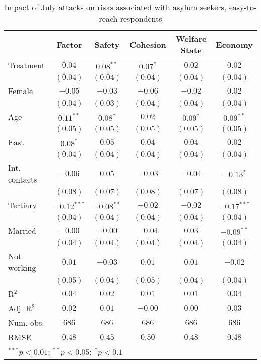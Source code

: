 
\begin{table}
\caption{Impact of July attacks on risks associated with asylum seekers, easy-to-reach respondents}
\begin{center}
\begin{tabular}{l c c c c c}
\toprule
 & Factor & Safety & Cohesion & Welfare State & Economy \\
\midrule
Treatment     & $0.04$        & $0.08^{**}$  & $0.07^{*}$ & $0.02$     & $0.02$        \\
              & $(0.04)$      & $(0.04)$     & $(0.04)$   & $(0.04)$   & $(0.04)$      \\
Female        & $-0.05$       & $-0.03$      & $-0.06$    & $-0.02$    & $0.02$        \\
              & $(0.04)$      & $(0.03)$     & $(0.04)$   & $(0.04)$   & $(0.04)$      \\
Age           & $0.11^{**}$   & $0.08^{*}$   & $0.02$     & $0.09^{*}$ & $0.09^{**}$   \\
              & $(0.05)$      & $(0.05)$     & $(0.05)$   & $(0.05)$   & $(0.05)$      \\
East          & $0.08^{*}$    & $0.05$       & $0.04$     & $0.04$     & $0.02$        \\
              & $(0.04)$      & $(0.04)$     & $(0.04)$   & $(0.04)$   & $(0.04)$      \\
Int. contacts & $-0.06$       & $0.05$       & $-0.03$    & $-0.04$    & $-0.13^{*}$   \\
              & $(0.08)$      & $(0.07)$     & $(0.08)$   & $(0.07)$   & $(0.08)$      \\
Tertiary      & $-0.12^{***}$ & $-0.08^{**}$ & $-0.02$    & $-0.02$    & $-0.17^{***}$ \\
              & $(0.04)$      & $(0.04)$     & $(0.04)$   & $(0.04)$   & $(0.04)$      \\
Married       & $-0.00$       & $-0.00$      & $-0.04$    & $0.03$     & $-0.09^{**}$  \\
              & $(0.04)$      & $(0.04)$     & $(0.04)$   & $(0.04)$   & $(0.04)$      \\
Not working   & $0.01$        & $-0.03$      & $0.01$     & $0.01$     & $-0.02$       \\
              & $(0.05)$      & $(0.04)$     & $(0.05)$   & $(0.04)$   & $(0.04)$      \\
\midrule
R$^2$         & $0.04$        & $0.02$       & $0.01$     & $0.01$     & $0.04$        \\
Adj. R$^2$    & $0.02$        & $0.01$       & $-0.00$    & $0.00$     & $0.03$        \\
Num. obs.     & $686$         & $686$        & $686$      & $686$      & $686$         \\
RMSE          & $0.48$        & $0.45$       & $0.50$     & $0.48$     & $0.48$        \\
\bottomrule
\multicolumn{6}{l}{\scriptsize{$^{***}p<0.01$; $^{**}p<0.05$; $^{*}p<0.1$}}
\end{tabular}
\label{tab_risk_reach}
\end{center}
\end{table}
